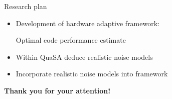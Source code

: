 \documentclass{dfki}
\begin{document}



\begin{frame}{Research plan}
	\vspace{-20pt}
	\begin{itemize}
		\item Development of hardware adaptive framework:
			\begin{center}
				\hspace{4.5cm}
				Optimal code performance estimate
			\end{center}\vspace{20pt}
		\item Within QuaSA deduce realistic noise models
		\item Incorporate realistic noise models into framework
	\end{itemize}
\end{frame}


\begin{frame}
	\begin{center}
		{\huge\textbf{Thank you for your attention!}}
	\end{center}
\end{frame}

\printbibliography
\end{document}
